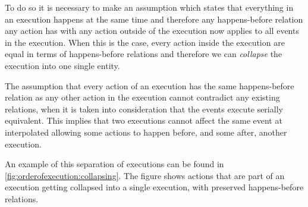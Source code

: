 	
	To do so it is necessary to make an assumption which states that everything in an execution happens at the same time  and therefore any happens-before relation any action has with any action outside of the execution now applies to all events in the execution. When this is the case, every action inside the execution are equal in terms of happens-before relations and therefore we can \textit{collapse} the execution into one single entity. 
	
	The assumption that every action of an execution has the same happens-before relation as any other action in the execution cannot contradict any existing relations, when it is taken into consideration that the events execute serially equivalent. This implies that two executions cannot affect the same event at interpolated allowing some actions to happen before, and some after, another execution.
	
	\newpar An example of this separation of executions can be found in \autoref{fig:orderofexecution:collapsing}. The figure shows actions that are part of an execution getting collapsed into a single execution, with preserved happens-before relations. 
	


	


